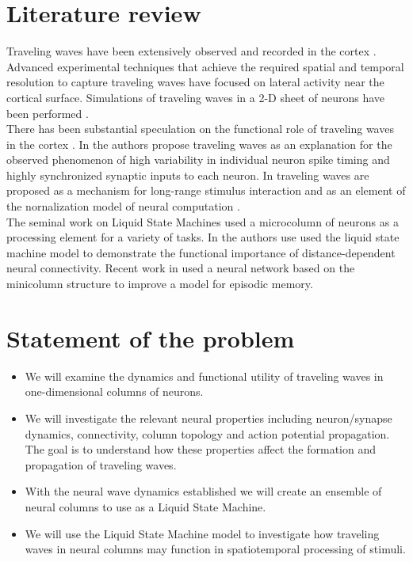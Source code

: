 \documentclass[a4paper,11pt]{article}
\begin{document}
\section{Literature review}
Traveling waves have been extensively observed and recorded in the cortex \cite{sato2012} \cite{wu2008} \cite{muller2018}.
Advanced experimental techniques that achieve the required spatial and temporal resolution \cite{shoham1999}\cite{wu2008} to capture traveling waves have focused on lateral activity near the cortical surface.
Simulations of traveling waves in a 2-D sheet of neurons have been performed \cite{keane2015}. 
\\
There has been substantial speculation on the functional role of traveling waves in the cortex \cite{muller2018}\cite{sato2012}.
In \cite{keane2015} the authors propose traveling waves as an explanation for the observed phenomenon of high variability in individual neuron spike timing and highly synchronized synaptic inputs to each neuron.
In \cite{sato2012} traveling waves are proposed as a mechanism for long-range stimulus interaction and as an element of the nornalization model of neural computation \cite{carandini2012}.
\\
The seminal work on Liquid State Machines \cite{maas2002} used a microcolumn of neurons as a processing element for a variety of tasks.
In \cite{pyle2017} the authors use used the liquid state machine model to demonstrate the functional importance of distance-dependent neural connectivity. 
Recent work in \cite{basawaraj2019} used a neural network based on the minicolumn structure to improve a model for episodic memory.

\section{Statement of the problem}
\begin{itemize}
 \item We will examine the dynamics and functional utility of traveling waves in one-dimensional columns of neurons.
 \item We will investigate the relevant neural properties including neuron/synapse dynamics, connectivity, column topology and action potential propagation. The goal is to understand how these properties affect the formation and propagation of traveling waves.
 \item With the neural wave dynamics established we will create an ensemble of neural columns to use as a Liquid State Machine\cite{maas2002}.
 \item We will use the Liquid State Machine model to investigate how traveling waves in neural columns may function in spatiotemporal processing of stimuli.
\end{itemize}
\end{document}
